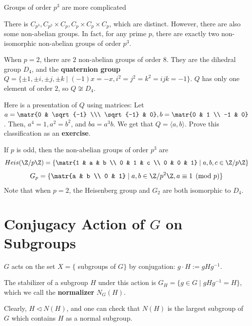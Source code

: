 \begin{rmk}
    Groups of order $p^3$ are more complicated
\end{rmk}
There is $C_{p^3},C_{p^2}\times C_p,C_p\times C_p \times C_p$, which are distinct. However, there are also some non-abelian groups. In fact, for any prime $p$, there are exactly two non-isomorphic non-abelian groups of order $p^3$.

\begin{ex}[$p=2$]
    When $p=2$, there are $2$ non-abelian groups of order $8$. They are the dihedral group $D_4$, and the \textbf{quaternion group} $Q=\{\pm 1, \pm i, \pm j, \pm k\mid(-1)x=-x,i^2=j^2=k^2=ijk=-1 \}$. $Q$ has only one element of order $2$, so $Q \not \cong D_4$.

    Here is a presentation of $Q$ using matrices: Let $a = \matr{0 & \sqrt {-1} \\\ \sqrt{-1} & 0},b=\matr{0 & 1 \\ -1 & 0}$. Then, $a^4=1,a^2=b^2$, and $ba=a^3b$. We get that $Q = \langle a,b \rangle$. Prove this classification as an \textbf{exercise}.
\end{ex}

If $p$ is odd, then the non-abelian groups of order $p^3$ are
$$Heis(\Z/p\Z) =\{ \matr{1 & a & b \\ 0 & 1 & c \\ 0 & 0 & 1}\mid a,b,c\in \Z/p\Z\}$$
$$G_p=\{ \matr{a & b \\ 0 & 1} \mid a,b \in \Z/p^2\Z,a \equiv 1 \pmod p \}$$
Note that when $p=2$, the Heisenberg group and $G_2$ are both isomorphic to $D_4$.

\section{\texorpdfstring{Conjugacy Action of $G$ on Subgroups}{Conjugacy Action of G on Subgroups}}
$G$ acts on the set $X = \{$ subgroups of $G\}$ by conjugation: $g\cdot H:= gHg^{-1}$.

\begin{defn}
    The stabilizer of a subgroup $H$ under this action is $G_H=\{g\in G \mid gHg^{-1}=H\}$, which we call the \textbf{normalizer} $N_G(H)$.
\end{defn}

\begin{rmk}
    Clearly, $H \lhd N(H)$, and one can check that $N(H)$ is the largest subgroup of $G$ which contains $H$ as a normal subgroup.
\end{rmk}

